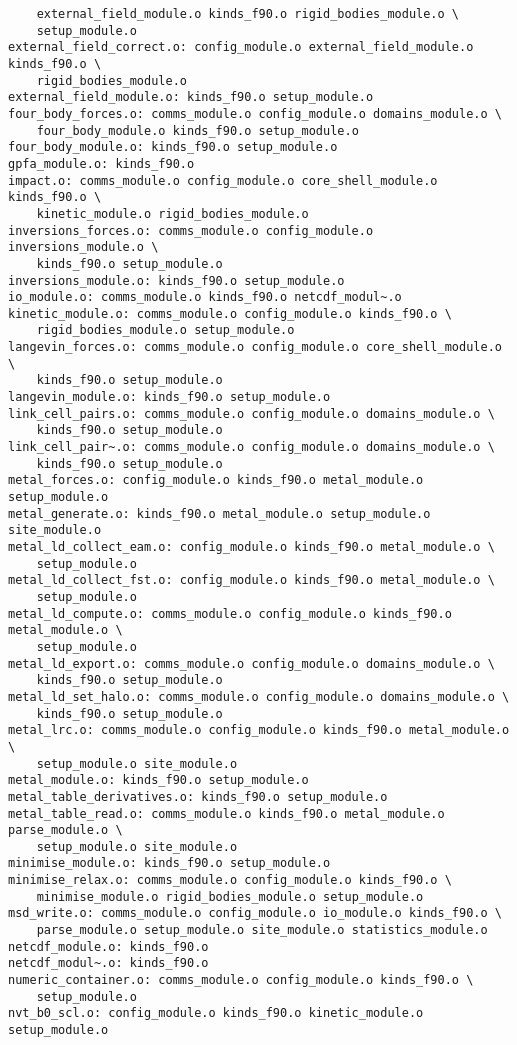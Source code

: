 \begin{verbatim}
	external_field_module.o kinds_f90.o rigid_bodies_module.o \
	setup_module.o
external_field_correct.o: config_module.o external_field_module.o kinds_f90.o \
	rigid_bodies_module.o
external_field_module.o: kinds_f90.o setup_module.o
four_body_forces.o: comms_module.o config_module.o domains_module.o \
	four_body_module.o kinds_f90.o setup_module.o
four_body_module.o: kinds_f90.o setup_module.o
gpfa_module.o: kinds_f90.o
impact.o: comms_module.o config_module.o core_shell_module.o kinds_f90.o \
	kinetic_module.o rigid_bodies_module.o
inversions_forces.o: comms_module.o config_module.o inversions_module.o \
	kinds_f90.o setup_module.o
inversions_module.o: kinds_f90.o setup_module.o
io_module.o: comms_module.o kinds_f90.o netcdf_modul~.o
kinetic_module.o: comms_module.o config_module.o kinds_f90.o \
	rigid_bodies_module.o setup_module.o
langevin_forces.o: comms_module.o config_module.o core_shell_module.o \
	kinds_f90.o setup_module.o
langevin_module.o: kinds_f90.o setup_module.o
link_cell_pairs.o: comms_module.o config_module.o domains_module.o \
	kinds_f90.o setup_module.o
link_cell_pair~.o: comms_module.o config_module.o domains_module.o \
	kinds_f90.o setup_module.o
metal_forces.o: config_module.o kinds_f90.o metal_module.o setup_module.o
metal_generate.o: kinds_f90.o metal_module.o setup_module.o site_module.o
metal_ld_collect_eam.o: config_module.o kinds_f90.o metal_module.o \
	setup_module.o
metal_ld_collect_fst.o: config_module.o kinds_f90.o metal_module.o \
	setup_module.o
metal_ld_compute.o: comms_module.o config_module.o kinds_f90.o metal_module.o \
	setup_module.o
metal_ld_export.o: comms_module.o config_module.o domains_module.o \
	kinds_f90.o setup_module.o
metal_ld_set_halo.o: comms_module.o config_module.o domains_module.o \
	kinds_f90.o setup_module.o
metal_lrc.o: comms_module.o config_module.o kinds_f90.o metal_module.o \
	setup_module.o site_module.o
metal_module.o: kinds_f90.o setup_module.o
metal_table_derivatives.o: kinds_f90.o setup_module.o
metal_table_read.o: comms_module.o kinds_f90.o metal_module.o parse_module.o \
	setup_module.o site_module.o
minimise_module.o: kinds_f90.o setup_module.o
minimise_relax.o: comms_module.o config_module.o kinds_f90.o \
	minimise_module.o rigid_bodies_module.o setup_module.o
msd_write.o: comms_module.o config_module.o io_module.o kinds_f90.o \
	parse_module.o setup_module.o site_module.o statistics_module.o
netcdf_module.o: kinds_f90.o
netcdf_modul~.o: kinds_f90.o
numeric_container.o: comms_module.o config_module.o kinds_f90.o \
	setup_module.o
nvt_b0_scl.o: config_module.o kinds_f90.o kinetic_module.o setup_module.o

\end{verbatim}
